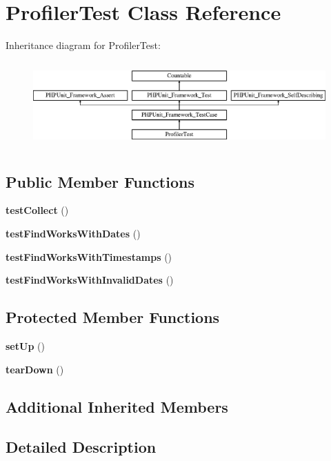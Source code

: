 \section{Profiler\+Test Class Reference}
\label{class_symfony_1_1_component_1_1_http_kernel_1_1_tests_1_1_profiler_1_1_profiler_test}
Inheritance diagram for Profiler\+Test\+:\begin{figure}[H]
\begin{center}
\leavevmode
\includegraphics[height=3.303835cm]{class_symfony_1_1_component_1_1_http_kernel_1_1_tests_1_1_profiler_1_1_profiler_test}
\end{center}
\end{figure}
\subsection*{Public Member Functions}
\begin{DoxyCompactItemize}
\item 
{\bf test\+Collect} ()
\item 
{\bf test\+Find\+Works\+With\+Dates} ()
\item 
{\bf test\+Find\+Works\+With\+Timestamps} ()
\item 
{\bf test\+Find\+Works\+With\+Invalid\+Dates} ()
\end{DoxyCompactItemize}
\subsection*{Protected Member Functions}
\begin{DoxyCompactItemize}
\item 
{\bf set\+Up} ()
\item 
{\bf tear\+Down} ()
\end{DoxyCompactItemize}
\subsection*{Additional Inherited Members}


\subsection{Detailed Description}


